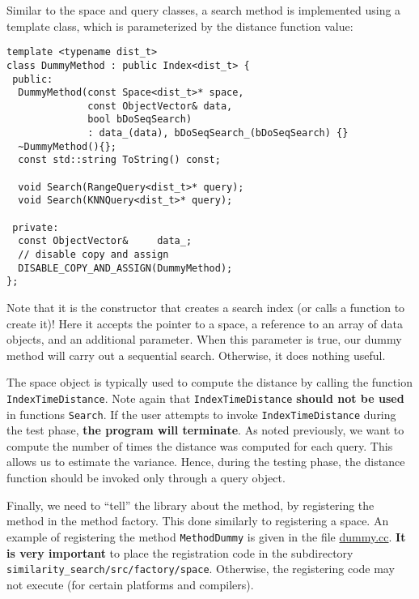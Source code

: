 \documentclass[runningheads,a4paper]{llncs}
\newcommand{\ttt}[1]{\texttt{#1}}
\begin{document}
\newpage
Similar to the space and query classes, a search method is implemented using
a template class, which is parameterized by the distance function value:
\begin{verbatim}
template <typename dist_t>
class DummyMethod : public Index<dist_t> {
 public:
  DummyMethod(const Space<dist_t>* space,
              const ObjectVector& data, 
              bool bDoSeqSearch)
              : data_(data), bDoSeqSearch_(bDoSeqSearch) {}
  ~DummyMethod(){};
  const std::string ToString() const;
   
  void Search(RangeQuery<dist_t>* query);
  void Search(KNNQuery<dist_t>* query);

 private:
  const ObjectVector&     data_;
  // disable copy and assign
  DISABLE_COPY_AND_ASSIGN(DummyMethod);
};
\end{verbatim}

Note that it is the constructor that creates a search index (or calls a function to create it)!
Here it accepts the pointer to a space,
a reference to an array of data objects, 
and an additional parameter.
When this parameter is true, our dummy method will carry out a sequential search.
Otherwise, it does nothing useful.

The space object is typically used to compute the distance by calling
the function \ttt{IndexTimeDistance}.
Note again that \ttt{IndexTimeDistance} \textbf{should not be used} in functions
\ttt{Search}. 
If the user attempts to invoke \ttt{IndexTimeDistance} during the test phase,
\textbf{the program will terminate}.
As noted previously, we want to compute the number of times
the distance was computed for each query. This allows us to estimate the variance.
Hence, during the testing phase, the distance function should be invoked only through
a query object.


Finally, we need to ``tell'' the library about the method,
by registering the method in the method factory.
This done similarly to registering a space.
An example of registering the method \ttt{MethodDummy}
is given in the file \href{https://github.com/searchivarius/NonMetricSpaceLib/blob/master/similarity_search/src/factory/method/dummy.cc}{dummy.cc}.
\textbf{It is very important} to place the registration code in the subdirectory \newline
\ttt{similarity\_search/src/factory/space}. Otherwise, the registering code may not execute (for certain
platforms and compilers).
\end{document}
